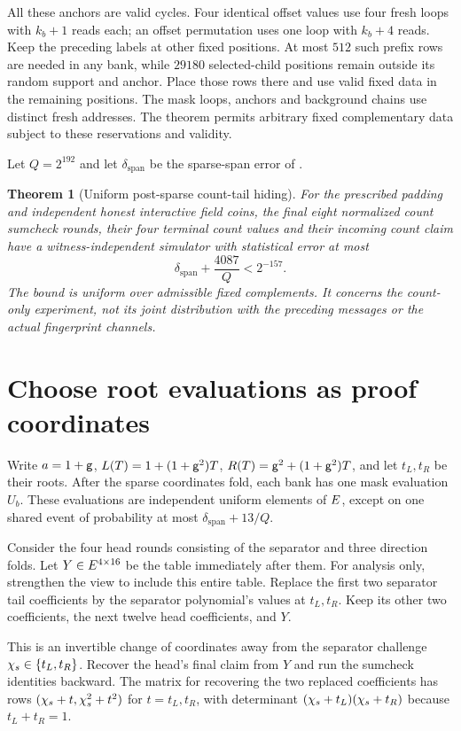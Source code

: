 \documentclass[11pt]{article}
\newtheorem{theorem}{Theorem}
\begin{document}
All these anchors are valid cycles. Four identical offset values use four fresh loops with $k_b+1$ reads each; an offset permutation uses one loop with $k_b+4$ reads. Keep the preceding labels at other fixed positions. At most $512$ such prefix rows are needed in any bank, while $29180$ selected-child positions remain outside its random support and anchor. Place those rows there and use valid fixed data in the remaining positions. The mask loops, anchors and background chains use distinct fresh addresses. The theorem permits arbitrary fixed complementary data subject to these reservations and validity.

Let $Q=2^{192}$ and let $\delta_{\mathrm{span}}$ be the sparse-span error of .

\begin{theorem}[Uniform post-sparse count-tail hiding]
For the prescribed padding and independent honest interactive field coins, the final eight normalized count sumcheck rounds, their four terminal count values and their incoming count claim have a witness-independent simulator with statistical error at most
\[
 \delta_{\mathrm{span}}+\frac{4087}{Q}<2^{-157}.
\]
The bound is uniform over admissible fixed complements. It concerns the count-only experiment, not its joint distribution with the preceding messages or the actual fingerprint channels.
\end{theorem}

\section{Choose root evaluations as proof coordinates}

Write $a=1+\mathsf{g}$, $L(T)=1+(1+\mathsf{g}^2)T$, $R(T)=\mathsf{g}^2+(1+\mathsf{g}^2)T$, and let $t_L,t_R$ be their roots. After the sparse coordinates fold, each bank has one mask evaluation $U_b$. These evaluations are independent uniform elements of $E$, except on one shared event of probability at most $\delta_{\mathrm{span}}+13/Q$.

Consider the four head rounds consisting of the separator and three direction folds. Let $Y\in E^{4\times16}$ be the table immediately after them. For analysis only, strengthen the view to include this entire table. Replace the first two separator tail coefficients by the separator polynomial's values at $t_L,t_R$. Keep its other two coefficients, the next twelve head coefficients, and $Y$.

This is an invertible change of coordinates away from the separator challenge $\chi_s\in\{t_L,t_R\}$. Recover the head's final claim from $Y$ and run the sumcheck identities backward. The matrix for recovering the two replaced coefficients has rows $(\chi_s+t,\chi_s^2+t^2)$ for $t=t_L,t_R$, with determinant $(\chi_s+t_L)(\chi_s+t_R)$ because $t_L+t_R=1$.
\end{document}
